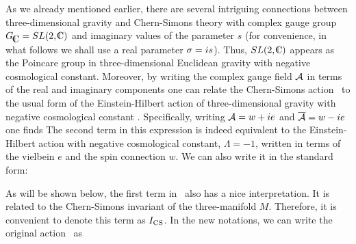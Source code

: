 As we already mentioned earlier, there are several
intriguing connections between three-dimensional gravity and
Chern-Simons theory with complex gauge group $\CCG = SL(2, \IC)$
and imaginary values
of the parameter $s$ (for convenience,
in what follows we shall use a real parameter $\sigma = is$).
Thus, $SL(2,\IC)$ appears as the Poincare group in three-dimensional
Euclidean gravity with negative cosmological
constant.
Moreover, by writing the complex gauge field ${\cal A}$
in terms of the real and imaginary components one can relate
the Chern-Simons action \iaction\ to the usual form of
the Einstein-Hilbert action of three-dimensional gravity
with negative cosmological constant .
Specifically, writing ${\cal A}=w + ie$ and $\overline {{\cal A}}=w - ie$
one finds
%
\eqn{}
%
The second term in this expression is indeed equivalent to
the Einstein-Hilbert action
with negative cosmological constant, $\Lambda=-1$,
written in terms of the vielbein $e$ and the spin connection $w$.
We can also write it in the standard form:
%
\eqn{}
%

As will be shown below, the first term in \icsgrav\
also has a nice interpretation. It is related to
the Chern-Simons invariant of the three-manifold $M$.
Therefore, it is convenient to denote this term as $I_{{\rm CS}}$.
In the new notations, we can write the original action \iaction\ as
%
\eqn{}
%

